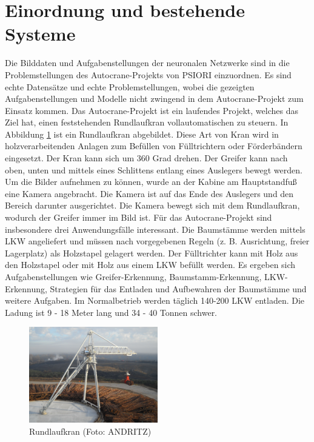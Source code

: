 	\section{Einordnung und bestehende Systeme}
	\label{sec:BestehendesSystem}
	Die Bilddaten und Aufgabenstellungen der neuronalen Netzwerke sind in die Problemstellungen des Autocrane-Projekts \cite{PSIORIGmbH.2020} von PSIORI einzuordnen. Es sind echte Datensätze und echte Problemstellungen, wobei die gezeigten Aufgabenstellungen und Modelle nicht zwingend in dem Autocrane-Projekt zum Einsatz kommen. Das Autocrane-Projekt ist ein laufendes Projekt, welches das Ziel hat, einen feststehenden Rundlaufkran vollautomatischen zu steuern. In Abbildung \ref{img:CircularCrane} ist ein Rundlaufkran abgebildet. Diese Art von Kran wird in holzverarbeitenden Anlagen zum Befüllen von Fülltrichtern oder Förderbändern eingesetzt. Der Kran kann sich um 360 Grad drehen. Der Greifer kann nach oben, unten und mittels eines Schlittens entlang eines Auslegers bewegt werden. Um die Bilder aufnehmen zu können, wurde an der Kabine am Hauptstandfuß eine Kamera angebracht. Die Kamera ist auf das Ende des Auslegers und den Bereich darunter ausgerichtet. Die Kamera bewegt sich mit dem Rundlaufkran, wodurch der Greifer immer im Bild ist. Für das Autocrane-Projekt sind insbesondere drei Anwendungsfälle interessant. Die Baumstämme werden mittels LKW angeliefert und müssen nach vorgegebenen Regeln (z. B. Ausrichtung, freier Lagerplatz) als Holzstapel gelagert werden. Der Fülltrichter kann mit Holz aus den Holzstapel oder mit Holz aus einem LKW befüllt werden. Es ergeben sich Aufgabenstellungen wie Greifer-Erkennung, Baumstamm-Erkennung, LKW-Erkennung, Strategien für das Entladen und Aufbewahren der Baumstämme und weitere Aufgaben. Im Normalbetrieb werden täglich 140-200 LKW entladen. Die Ladung ist 9 - 18 Meter lang und 34 - 40 Tonnen schwer. 
	\begin{figure}[h]
		\centering
		\includegraphics[width=0.5\textwidth, center]{bilder/Grundlagen/Kran_vollstaendig_N1_030.jpg}
		\caption[Rundlaufkran]{Rundlaufkran (Foto: ANDRITZ)}
		\label{img:CircularCrane}
	\end{figure}		

